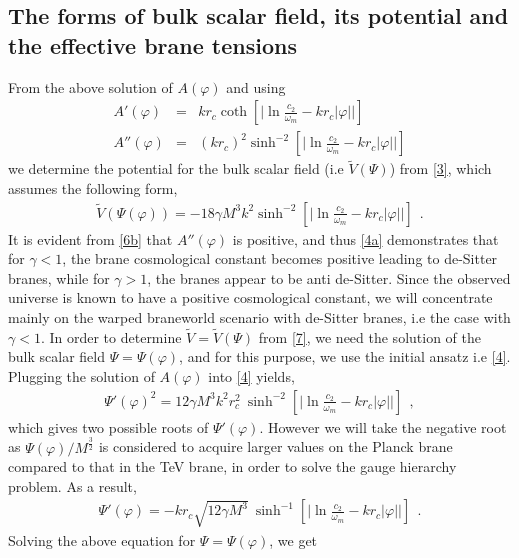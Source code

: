 \documentclass{article}
\begin{document}
\subsection{The forms of bulk scalar field, its potential and the effective brane tensions}
\label{S2-2}
From the above solution of $A(\varphi)$ and using
\begin{eqnarray}
 A'(\varphi)&=&kr_c\coth\left[\Big|\ln{\frac{c_2}{\omega_m}} - kr_c|\varphi|\Big|\right] \label{6a}\\
 A''(\varphi)&=&\left(kr_c\right)^2 \sinh^{-2}\left[\Big|\ln{\frac{c_2}{\omega_m}} - kr_c|\varphi|\Big|\right]
 \label{6b}
\end{eqnarray}
we determine the potential for the bulk scalar field (i.e $\tilde{V}(\Psi)$) 
from \ref{3}, which assumes the following form,
\begin{eqnarray}
\tilde{ V}(\Psi(\varphi)) = -18\gamma M^3k^2 \sinh^{-2}\left[\Big|\ln{\frac{c_2}{\omega_m}} - kr_c|\varphi|\Big|\right]~~.
 \label{7}
\end{eqnarray}
It is evident from \ref{6b} that $A''(\varphi)$ is positive, and thus \ref{4a} demonstrates that for $\gamma < 1$, 
the brane cosmological constant becomes positive leading to de-Sitter branes, while for $\gamma > 1$, the branes appear to be anti de-Sitter. 
Since the observed universe is known to have a positive cosmological constant, we will concentrate mainly on 
the warped braneworld scenario with de-Sitter branes, i.e the case with $\gamma < 1$. 
In order to determine $\tilde{V} = \tilde{V}(\Psi)$ from \ref{7}, we need the solution of the bulk scalar field 
$\Psi = \Psi(\varphi)$, and for this purpose, we use the initial ansatz i.e \ref{4}. Plugging the solution of $A(\varphi)$ into 
\ref{4} yields,
\begin{eqnarray}
 \Psi'(\varphi)^2 = 12\gamma M^3k^2r_c^2~\sinh^{-2}\left[\Big|\ln{\frac{c_2}{\omega_m}} - kr_c|\varphi|\Big|\right]~~,
 \label{8}
\end{eqnarray}
which gives two possible roots of $\Psi'(\varphi)$. However we will take the negative root as $\Psi(\varphi)/M^{\frac{3}{2}}$ is considered to acquire 
larger values on the Planck brane compared to that in the TeV brane, in order to solve the gauge hierarchy problem. As a result,
\begin{eqnarray}
 \Psi'(\varphi) = -kr_c\sqrt{12\gamma M^3}~\sinh^{-1}\left[\Big|\ln{\frac{c_2}{\omega_m}} - kr_c|\varphi|\Big|\right]~~.
 \label{9}
\end{eqnarray}
Solving the above equation for $\Psi = \Psi(\varphi)$, we get
\end{document}

